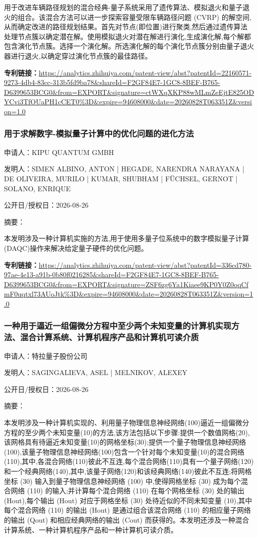 \documentclass[12pt,a4paper]{ctexart}
\begin{document}
用于改进车辆路径规划的混合经典-量子系统采用了遗传算法、模拟退火和量子退火的组合。该混合方法可以进一步探索容量受限车辆路径问题 (CVRP) 的解空间,从而确定改进的路径规划结果。首先对节点(即位置)进行聚类,然后通过遗传算法处理节点簇以确定潜在解。使用模拟退火对潜在解进行演化,生成演化解,每个解都包含演化节点簇。选择一个演化解。所选演化解的每个演化节点簇分别由量子退火器进行退火,以确定穿过演化节点簇的最佳路径。

\noindent\textbf{专利链接：}\url{https://analytics.zhihuiya.com/patent-view/abst?patentId=22160571-9273-4db4-83cc-313b5fd9ba78&shareId=F2GF84E7-1GC8-8BEF-B765-D6399653BCG0&from=EXPORT&signature=ctWXqXKP88wMLmZeEjtE825ODYCvi3TfOUaPH1cCET0%3D&expire=94608000&date=20260828T063351Z&version=1.0}

\subsubsection{ 用于求解数字-模拟量子计算中的优化问题的进化方法 }

申请人：KIPU QUANTUM GMBH

发明人：SIMEN ALBINO, ANTON | HEGADE, NARENDRA NARAYANA | DE OLIVEIRA, MURILO | KUMAR, SHUBHAM | FÜCHSEL, GERNOT | SOLANO, ENRIQUE

公开日/授权日：2026-08-26

摘要：

本发明涉及一种计算机实施的方法,用于使用多量子位系统中的数字模拟量子计算(DAQC)操作来解决给定量子硬件的优化问题。

\noindent\textbf{专利链接：}\url{https://analytics.zhihuiya.com/patent-view/abst?patentId=336cd780-97ae-4e13-a91b-0b80f0216285&shareId=F2GF84E7-1GC8-8BEF-B765-D6399653BCG0&from=EXPORT&signature=ZSF6zg6Ya1Kiaee9KP0Y0Z0oqCfmF0uqtxl73AUoJtk%3D&expire=94608000&date=20260828T063351Z&version=1.0}

\subsubsection{ 一种用于逼近一组偏微分方程中至少两个未知变量的计算机实现方法、混合计算系统、计算机程序产品和计算机可读介质 }

申请人：特拉量子股份公司

发明人：SAGINGALIEVA, ASEL | MELNIKOV, ALEXEY

公开日/授权日：2026-08-26

摘要：

本发明涉及一种计算机实现的、利用量子物理信息神经网络(100)逼近一组偏微分方程的至少两个未知变量(10)的方法,该方法包括以下步骤:提供一个数值网格(20),该网格具有待逼近未知变量(10)的网格坐标(30);提供一个量子物理信息神经网络(100),该量子物理信息神经网络(100)包含一个针对每个未知变量(10)的混合网络(110),其中,各混合网络(110)彼此不互连,每个混合网络(110)具有一个量子网络(120)和一个经典网络(140),其中,该量子网络(120)和该经典网络(140)彼此不互连;将网格坐标 (30) 输入到量子物理信息神经网络 (100) 中,使得网格坐标 (30) 成为每个混合网络 (110) 的输入;并计算每个混合网络 (110) 在每个网格坐标 (30) 处的输出 (Hout),每个输出 (Hout) 对应于网格坐标 (30) 处待近似的不同未知变量 (10),其中每个混合网络 (110) 的输出 (Hout) 是通过组合该混合网络 (110) 的相应量子网络的输出 (Qout) 和相应经典网络的输出 (Cout) 而获得的。本发明还涉及一种混合计算系统、一种计算机程序产品和一种计算机可读介质。
\end{document}
